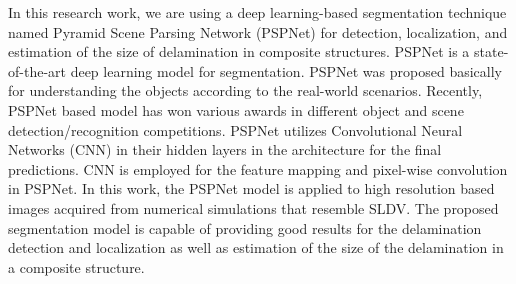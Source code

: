 \documentclass[11pt,a4paper]{article}
\begin{document}
In this research work, we are using a deep learning-based segmentation technique named Pyramid Scene Parsing Network (PSPNet) for detection, localization, and estimation of the size of delamination in composite structures. PSPNet is a state-of-the-art deep learning model for segmentation. PSPNet was proposed basically for understanding the objects according to the real-world scenarios. Recently, PSPNet based model has won various awards in different object and scene detection/recognition competitions. PSPNet utilizes Convolutional Neural Networks (CNN) in their hidden layers in the architecture for the final predictions. CNN is employed for the feature mapping and pixel-wise convolution in PSPNet.
In this work, the PSPNet model is applied to high resolution based images acquired from numerical simulations that resemble SLDV. The proposed segmentation model is capable of providing good results for the delamination detection and localization as well as estimation of the size of the delamination in a composite structure.
\end{document}

